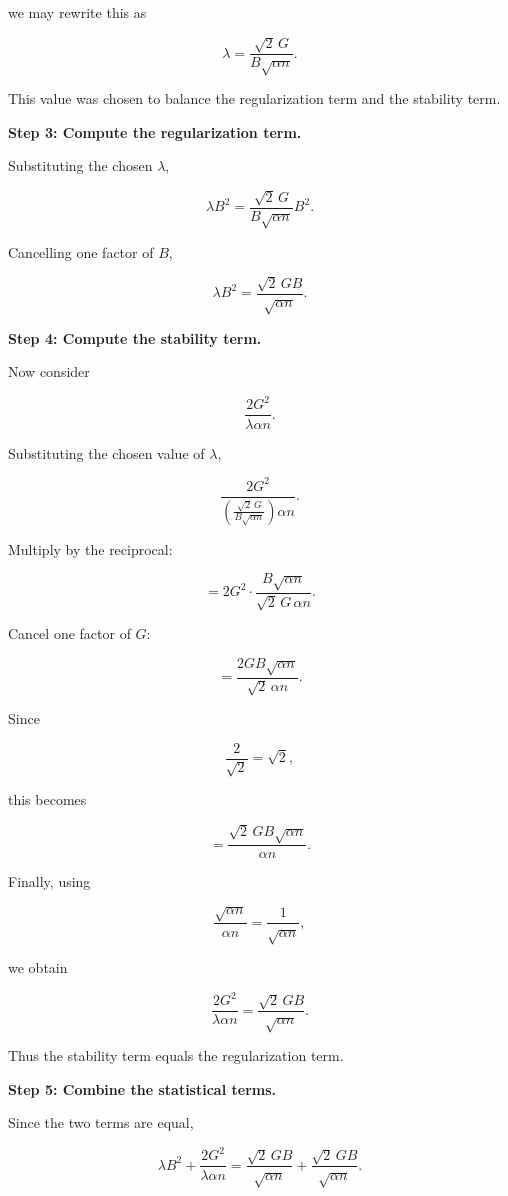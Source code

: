 \documentclass[11pt]{article}
\begin{document}
\begin{enumerate}
\begin{solutionbox}
we may rewrite this as

\[
\lambda
=
\frac{\sqrt2\,G}
     {B\sqrt{\alpha n}}.
\]

This value was chosen to balance the regularization term and the stability term.

\medskip

\textbf{Step 3: Compute the regularization term.}

Substituting the chosen \(\lambda\),

\[
\lambda B^2
=
\frac{\sqrt2\,G}
     {B\sqrt{\alpha n}}
     B^2.
\]

Cancelling one factor of \(B\),

\[
\lambda B^2
=
\frac{\sqrt2\,GB}
     {\sqrt{\alpha n}}.
\]

\medskip

\textbf{Step 4: Compute the stability term.}

Now consider

\[
\frac{2G^2}
     {\lambda\alpha n}.
\]

Substituting the chosen value of \(\lambda\),

\[
\frac{2G^2}
{\left(
\frac{\sqrt2\,G}
     {B\sqrt{\alpha n}}
\right)\alpha n}.
\]

Multiply by the reciprocal:

\[
=
2G^2
\cdot
\frac{B\sqrt{\alpha n}}
     {\sqrt2\,G\,\alpha n}.
\]

Cancel one factor of \(G\):

\[
=
\frac{2GB\sqrt{\alpha n}}
     {\sqrt2\,\alpha n}.
\]

Since

\[
\frac{2}{\sqrt2}
=
\sqrt2,
\]

this becomes

\[
=
\frac{\sqrt2\,GB\sqrt{\alpha n}}
     {\alpha n}.
\]

Finally, using

\[
\frac{\sqrt{\alpha n}}
     {\alpha n}
=
\frac{1}
     {\sqrt{\alpha n}},
\]

we obtain

\[
\frac{2G^2}
     {\lambda\alpha n}
=
\frac{\sqrt2\,GB}
     {\sqrt{\alpha n}}.
\]

Thus the stability term equals the regularization term.

\medskip

\textbf{Step 5: Combine the statistical terms.}

Since the two terms are equal,

\[
\lambda B^2
+
\frac{2G^2}
     {\lambda\alpha n}
=
\frac{\sqrt2\,GB}
     {\sqrt{\alpha n}}
+
\frac{\sqrt2\,GB}
     {\sqrt{\alpha n}}.
\]


\end{solutionbox}
\end{enumerate}
\end{document}
